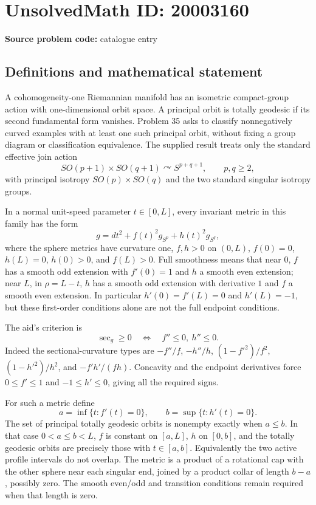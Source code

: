 \documentclass[11pt]{article}
\begin{document}
\section*{UnsolvedMath ID: 20003160}
\textbf{Source problem code:} catalogue entry
\subsection{Definitions and mathematical statement}
A cohomogeneity-one Riemannian manifold has an isometric compact-group action with one-dimensional orbit space. A principal orbit is totally geodesic if its second fundamental form vanishes. Problem 35 asks to classify nonnegatively curved examples with at least one such principal orbit, without fixing a group diagram or classification equivalence. The supplied result treats only the standard effective join action
\[
 SO(p+1)\times SO(q+1)\curvearrowright S^{p+q+1},\qquad p,q\geq2,
\]
with principal isotropy $SO(p)\times SO(q)$ and the two standard singular isotropy groups.

In a normal unit-speed parameter $t\in[0,L]$, every invariant metric in this family has the form
\[
 g=dt^2+f(t)^2g_{S^p}+h(t)^2g_{S^q},
\]
where the sphere metrics have curvature one, $f,h>0$ on $(0,L)$, $f(0)=0$, $h(L)=0$, $h(0)>0$, and $f(L)>0$. Full smoothness means that near $0$, $f$ has a smooth odd extension with $f'(0)=1$ and $h$ a smooth even extension; near $L$, in $\rho=L-t$, $h$ has a smooth odd extension with derivative $1$ and $f$ a smooth even extension. In particular $h'(0)=f'(L)=0$ and $h'(L)=-1$, but these first-order conditions alone are not the full endpoint conditions.

The aid's criterion is
\[
 \sec_g\geq0\quad\Longleftrightarrow\quad f''\leq0,\ h''\leq0.
\]
Indeed the sectional-curvature types are $-f''/f$, $-h''/h$, $(1-f'^2)/f^2$, $(1-h'^2)/h^2$, and $-f'h'/(fh)$. Concavity and the endpoint derivatives force $0\leq f'\leq1$ and $-1\leq h'\leq0$, giving all the required signs.

For such a metric define
\[
 a=\inf\{t:f'(t)=0\},\qquad b=\sup\{t:h'(t)=0\}.
\]
The set of principal totally geodesic orbits is nonempty exactly when $a\leq b$. In that case $0<a\leq b<L$, $f$ is constant on $[a,L]$, $h$ on $[0,b]$, and the totally geodesic orbits are precisely those with $t\in[a,b]$. Equivalently the two active profile intervals do not overlap. The metric is a product of a rotational cap with the other sphere near each singular end, joined by a product collar of length $b-a$, possibly zero. The smooth even/odd and transition conditions remain required when that length is zero.
\end{document}
